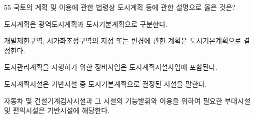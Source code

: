 \begin{question}{55}
국토의 계획 및 이용에 관한 법령상 도시계획 등에 관한 설명으로 옳은 것은?
\begin{choices}
  \item 도시계획은 광역도시계획과 도시기본계획으로 구분한다.
  \item 개발제한구역, 시가화조정구역의 지정 또는 변경에 관한 계획은 도시기본계획으로 결정한다.
  \item 도시관리계획을 시행하기 위한 정비사업은 도시계획시설사업에 포함된다.
  \item 도시계획시설은 기반시설 중 도시기본계획으로 결정된 시설을 말한다.
  \item 자동차 및 건설기계검사시설과 그 시설의 기능발휘와 이용을 위하여 필요한 부대시설 및 편익시설은 기반시설에 해당한다.
\end{choices}
\end{question}
